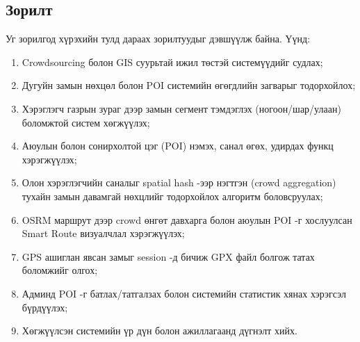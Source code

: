     \subsection*{Зорилт}
    Уг зорилгод хүрэхийн тулд дараах зорилтуудыг дэвшүүлж байна. Үүнд:
    \begin{enumerate}[nosep]
        \item Crowdsourcing болон GIS суурьтай ижил төстэй системүүдийг судлах;
        \item Дугуйн замын нөхцөл болон POI системийн өгөгдлийн загварыг тодорхойлох;
        \item Хэрэглэгч газрын зураг дээр замын сегмент тэмдэглэх (ногоон/шар/улаан) боломжтой систем хөгжүүлэх;
        \item Аюулын болон сонирхолтой цэг (POI) нэмэх, санал өгөх, удирдах функц хэрэгжүүлэх;
        \item Олон хэрэглэгчийн саналыг spatial hash -ээр нэгтгэн (crowd aggregation) тухайн замын давамгай нөхцлийг тодорхойлох алгоритм боловсруулах;
        \item OSRM маршрут дээр crowd өнгөт давхарга болон аюулын POI -г хослуулсан Smart Route визуалчлал хэрэгжүүлэх;
        \item GPS ашиглан явсан замыг session -д бичиж GPX файл болгож татах боломжийг олгох;
        \item Админд POI -г батлах/татгалзах болон системийн статистик хянах хэрэгсэл бүрдүүлэх;
        \item Хөгжүүлсэн системийн үр дүн болон ажиллагаанд дүгнэлт хийх.
    \end{enumerate}

